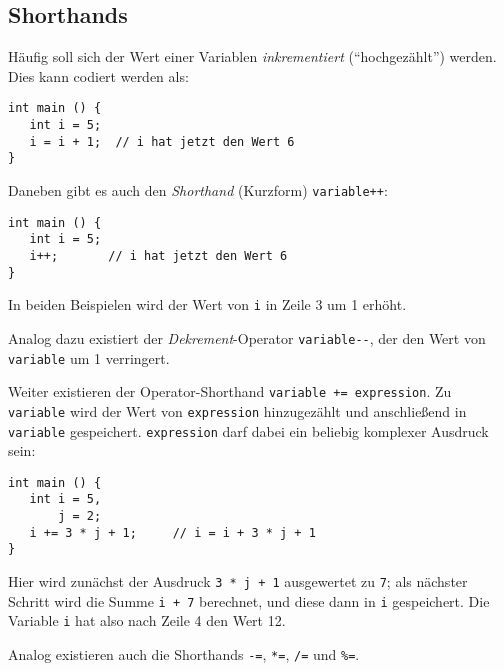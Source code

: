 \subsection{Shorthands}
Häufig soll sich der Wert einer Variablen \emph{inkrementiert} (\enquote{hochgezählt}) werden. Dies kann codiert werden als:
\begin{codebox}
\begin{verbatim}
int main () {
   int i = 5;
   i = i + 1;  // i hat jetzt den Wert 6
}
\end{verbatim}
\end{codebox}

Daneben gibt es auch den \emph{Shorthand} (Kurzform) \texttt{variable++}:
\begin{codebox}
\begin{verbatim}
int main () {
   int i = 5;
   i++;       // i hat jetzt den Wert 6
}
\end{verbatim}
\end{codebox}

In beiden Beispielen wird der Wert von \texttt{i} in Zeile 3 um 1 erhöht.

Analog dazu existiert der \emph{Dekrement}-Operator \texttt{variable-{}-}, der den Wert von \texttt{variable} um 1 verringert.

Weiter existieren der Operator-Shorthand \texttt{variable += expression}. Zu \texttt{variable} wird der Wert von \texttt{expression} hinzugezählt und anschließend in \texttt{variable} gespeichert. \texttt{expression} darf dabei ein beliebig komplexer Ausdruck sein:
\begin{codebox}[Beispiel: Inkrementieren einer Variablen i mit Shorthand \texttt{+=}]
\begin{verbatim}
int main () {
   int i = 5,
       j = 2;
   i += 3 * j + 1;     // i = i + 3 * j + 1
}
\end{verbatim}
\end{codebox}
Hier wird zunächst der Ausdruck \texttt{3 * j + 1} ausgewertet zu \texttt{7}; als nächster Schritt wird die Summe \texttt{i + 7} berechnet, und diese dann in \texttt{i} gespeichert. Die Variable \texttt{i} hat also nach Zeile 4 den Wert 12.

Analog existieren auch die Shorthands \texttt{-=}, \texttt{*=}, \texttt{/=} und \texttt{\%=}.

